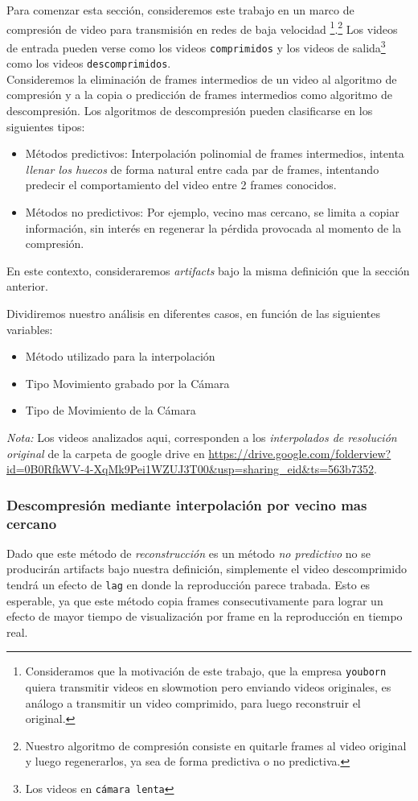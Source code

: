 Para comenzar esta sección, consideremos este trabajo en un marco de compresión de video para transmisión en redes de baja velocidad \footnote{Consideramos que la motivación de este trabajo, que la empresa \texttt{youborn} quiera transmitir videos en slowmotion pero enviando videos originales, es análogo a transmitir un video comprimido, para luego reconstruir el original.}.\footnote{Nuestro algoritmo de compresión consiste en quitarle frames al video original y luego regenerarlos, ya sea de forma predictiva o no predictiva.} Los videos de entrada pueden verse como los videos \texttt{comprimidos} y los videos de salida\footnote{Los videos en \texttt{cámara lenta}} como los videos \texttt{descomprimidos}.\\

Consideremos la eliminación de frames intermedios de un video al algoritmo de compresión y a la copia o predicción de frames intermedios como algoritmo de descompresión. Los algoritmos de descompresión pueden clasificarse en los siguientes tipos:
\begin{itemize}
	\item Métodos predictivos: Interpolación polinomial de frames intermedios, intenta \emph{llenar los huecos} de forma natural entre cada par de frames, intentando predecir el comportamiento del video entre 2 frames conocidos.
	\item Métodos no predictivos: Por ejemplo, vecino mas cercano, se limita a copiar información, sin interés en regenerar la pérdida provocada al momento de la compresión.
\end{itemize}

En este contexto, consideraremos \emph{artifacts} bajo la misma definición que la sección anterior.

Dividiremos nuestro análisis en diferentes casos, en función de las siguientes variables:
\begin{itemize}
	\item Método utilizado para la interpolación
	\item Tipo Movimiento grabado por la Cámara
	\item Tipo de Movimiento de la Cámara
\end{itemize}

\emph{Nota:} Los videos analizados aqui, corresponden a los \emph{interpolados de resolución original} de la carpeta de google drive en \url{https://drive.google.com/folderview?id=0B0RfkWV-4-XqMk9Pei1WZUJ3T00&usp=sharing_eid&ts=563b7352}.

\subsubsection{\bf{Descompresión mediante interpolación por vecino mas cercano}}
Dado que este método de \emph{reconstrucción} es un método \emph{no predictivo} no se producirán artifacts bajo nuestra definición, simplemente el video descomprimido tendrá un efecto de \texttt{lag} en donde la reproducción parece trabada. Esto es esperable, ya que este método copia frames consecutivamente para lograr un efecto de mayor tiempo de visualización por frame en la reproducción en tiempo real. 

